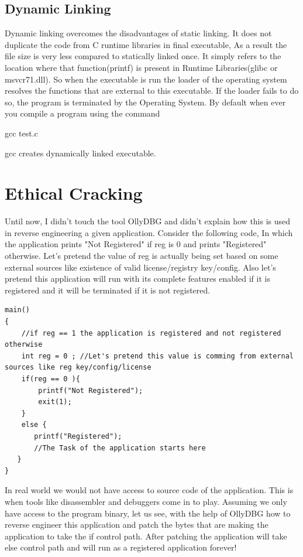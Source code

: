 \documentclass{article}
\begin{document}
\subsection{Dynamic Linking}
Dynamic linking overcomes the disadvantages of static linking. It does not duplicate the code from C runtime libraries in final executable, As a result the file size is very less compared to statically linked once. It simply refers to the location where that function(printf) is present in Runtime Libraries(glibc or msvcr71.dll). So when the executable is run the loader of the operating system resolves the functions that are external to this executable. If the loader fails to do so, the program is terminated by the Operating System. By default when ever you compile a program using the command

    gcc test.c

gcc creates dynamically linked executable.
\section{Ethical Cracking}
Until now, I didn't touch the tool OllyDBG and didn't explain how this is used in reverse engineering a given application. Consider the following code, In which the application prints "Not Registered" if reg is 0 and prints "Registered" otherwise. Let's pretend the value of reg is actually being set based on some external sources like existence of valid license/registry key/config. Also let's pretend this application will run with its complete features enabled if it is registered and it will be terminated if it is not registered.

\begin{verbatim}
main()
{
    //if reg == 1 the application is registered and not registered otherwise
    int reg = 0 ; //Let's pretend this value is comming from external sources like reg key/config/license
    if(reg == 0 ){
        printf("Not Registered");
        exit(1);
    }
    else {
       printf("Registered");
       //The Task of the application starts here
   }
}
\end{verbatim}
In real world we would not have access to source code of the application. This is when tools like disassembler and debuggers come in to play. Assuming we only have access to the program binary, let us see, with the help of OllyDBG how to reverse engineer this application and patch the bytes that are making the application to take the if control path. After patching the application will take else control path and will run as a registered application forever!
\end{document}

